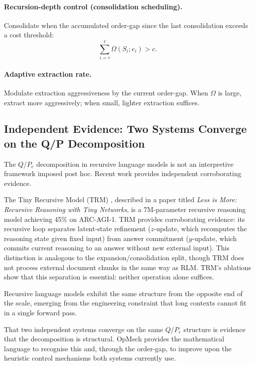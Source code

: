 \documentclass[12pt,a4paper]{article}
\newcommand{\Ogap}{\Omega}
\begin{document}
\paragraph{Recursion-depth control (consolidation scheduling).}
Consolidate when the accumulated order-gap since the last consolidation
exceeds a cost threshold:
\begin{equation}
\label{eq:rlm_recurse}
\sum_{i=\tau}^{t} \Ogap(S_i; e_i) > c.
\end{equation}

\paragraph{Adaptive extraction rate.}
Modulate extraction aggressiveness by the current order-gap. When $\Ogap$ is
large, extract more aggressively; when small, lighter extraction suffices.

\subsection{Independent Evidence: Two Systems Converge on the Q/P Decomposition}

The $Q$/$P_e$ decomposition in recursive language models is not an
interpretive framework imposed post hoc. Recent work provides independent
corroborating evidence.

The Tiny Recursive Model (TRM) \citep{jolicoeurmartineau2025trm}, described
in a paper titled \emph{Less is More: Recursive Reasoning with Tiny Networks},
is a 7M-parameter recursive reasoning model achieving 45\% on ARC-AGI-1.
TRM provides corroborating evidence: its recursive loop separates
latent-state refinement ($z$-update, which recomputes the reasoning state
given fixed input) from answer commitment ($y$-update, which commits current
reasoning to an answer without new external input). This distinction is
analogous to the expansion/consolidation split, though TRM does not process
external document chunks in the same way as RLM. TRM's ablations show that
this separation is essential: neither operation alone suffices.

Recursive language models \citep{zhang2025rlm} exhibit the same structure
from the opposite end of the scale, emerging from the engineering constraint
that long contexts cannot fit in a single forward pass.

That two independent systems converge on the same $Q$/$P_e$ structure is
evidence that the decomposition is structural. OpMech provides the
mathematical language to recognise this and, through the order-gap, to improve
upon the heuristic control mechanisms both systems currently use.
\end{document}
